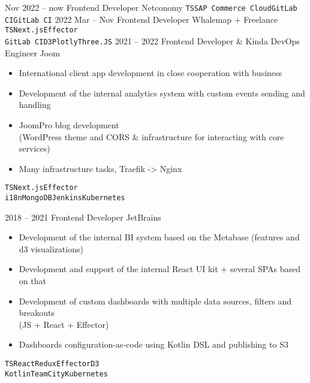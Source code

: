 \documentclass[10pt]{template}
\begin{document}
\begin{entrylist}
    \entry
	{Nov 2022 -- now}
	{Frontend Developer}
	{Netconomy}
	{
		\texttt{TS}\slashsep\texttt{SAP Commerce Cloud}\slashsep\texttt{GitLab CI}\slashsep\texttt{GitLab CI}}
    \entry
	{2022 Mar -- Nov}
	{Frontend Developer}
	{Whalemap + Freelance}
	{
		\texttt{TS}\slashsep\texttt{Next.js}\slashsep\texttt{Effector}\\
		{\color{gray}\texttt{GitLab CI}\slashsep\texttt{D3}\slashsep\texttt{Plotly}\slashsep\texttt{Three.JS}}}
	\entry
	{2021 -- 2022}
	{Frontend Developer \& Kinda DevOps Engineer}
	{Joom}
	{
	        \begin{itemize}[noitemsep,topsep=5pt,leftmargin=8pt]
		        \item International client app development in close cooperation with business
		        \item Development of the internal analytics system with custom events sending and handling
			\item JoomPro blog development\\ (WordPress theme and CORS \& infrastructure for interacting with core services)
		        \item Many infrastructure tasks, Traefik -> Nginx
		\end{itemize}
		\texttt{TS}\slashsep\texttt{Next.js}\slashsep\texttt{Effector}\\
		{\color{gray}\texttt{i18n}\slashsep\texttt{MongoDB}\slashsep\texttt{Jenkins}\slashsep\texttt{Kubernetes}}}
	\entry
	{2018 -- 2021}
	{Frontend Developer}
	{JetBrains}
	{
	        \begin{itemize}[noitemsep,topsep=5pt,leftmargin=8pt]
		        \item Development of the internal BI system based on the Metabase (features and d3 visualizations)
		        \item Development and support of the internal React UI kit + several SPAs based on that
		        \item Development of custom dashboards with multiple data sources, filters and breakouts\\ (JS + React + Effector)\\ 
		        \item Dashboards configuration-as-code using Kotlin DSL and publishing to S3
		\end{itemize}
		\texttt{TS}\slashsep\texttt{React}\slashsep\texttt{Redux}\slashsep\texttt{Effector}\slashsep\texttt{D3}\\
		{\color{gray} \texttt{Kotlin}\slashsep\texttt{TeamCity}\slashsep\texttt{Kubernetes}}}
\end{entrylist}
\end{document}
